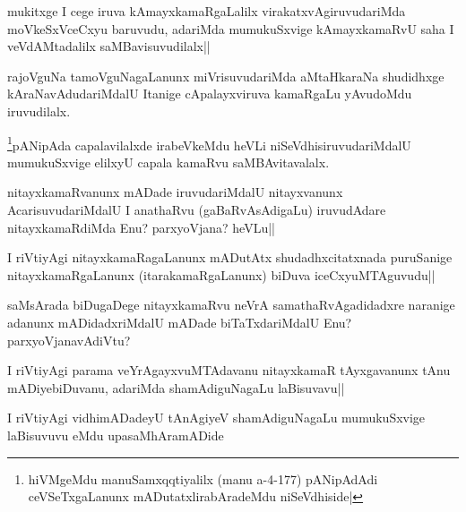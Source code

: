 \begin{artha}
mukitxge I cege iruva kAmayxkamaRgaLalilx virakatxvAgiruvudariMda moVkeSxVceCxyu baruvudu, adariMda mumukuSxvige kAmayxkamaRvU saha I veVdAMtadalilx saMBavisuvudilalx||
\end{artha}

\begin{artha}
rajoVguNa tamoVguNagaLanunx miVrisuvudariMda aMtaHkaraNa shudidhxge kAraNavAdudariMdalU Itanige cApalayxviruva kamaRgaLu yAvudoMdu iruvudilalx.
\end{artha}

\begin{artha}
\footnote{\stext hiVMgeMdu manuSamxqqtiyalilx (manu a-4-177) pANipAdAdi ceVSeTxgaLanunx mADutatxlirabAradeMdu niSeVdhiside|}pANipAda capalavilalxde irabeVkeMdu heVLi niSeVdhisiruvudariMdalU mumukuSxvige elilxyU capala kamaRvu saMBAvitavalalx.
\end{artha}

\begin{artha}
nitayxkamaRvanunx mADade iruvudariMdalU nitayxvanunx AcarisuvudariMdalU I anathaRvu (gaBaRvAsAdigaLu) iruvudAdare nitayxkamaRdiMda Enu? parxyoVjana? heVLu||
\end{artha}

\begin{artha}
I riVtiyAgi nitayxkamaRagaLanunx mADutAtx shudadhxcitatxnada puruSanige nitayxkamaRgaLanunx (itarakamaRgaLanunx) biDuva iceCxyuMTAguvudu||
\end{artha}


\begin{artha}
saMsArada biDugaDege nitayxkamaRvu neVrA samathaRvAgadidadxre naranige adanunx mADidadxriMdalU mADade biTaTxdariMdalU Enu?parxyoVjanavAdiVtu?
\end{artha}

\begin{artha}
I riVtiyAgi parama veYrAgayxvuMTAdavanu nitayxkamaR tAyxgavanunx tAnu mADiyebiDuvanu, adariMda shamAdiguNagaLu laBisuvavu||
\end{artha}

\begin{center}
I riVtiyAgi vidhimADadeyU tAnAgiyeV shamAdiguNagaLu mumukuSxvige laBisuvuvu eMdu upasaMhAramADide
\end{center}

\begin{artha}

\end{artha}
